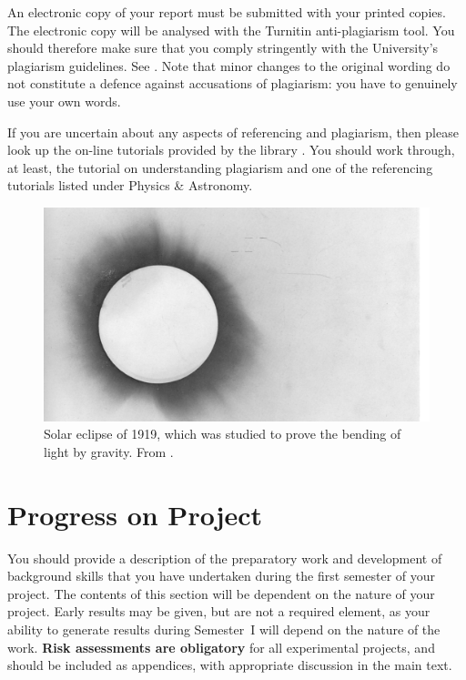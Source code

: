 \documentclass[a4paper,11pt]{article}
\begin{document}
An electronic copy of your report must be submitted with your printed copies. The electronic copy will be analysed with the Turnitin anti-plagiarism tool. You should therefore make sure that you comply stringently with the University's plagiarism guidelines. See \cite{plagiarism}. Note that minor changes to the original wording do not constitute a defence against accusations of plagiarism: you have to genuinely use your own words.

If you are uncertain about any aspects of referencing and plagiarism, then please look up the on-line tutorials provided by the library \cite{Referencing}. You should work through, at least, the tutorial on understanding plagiarism and one of the referencing tutorials listed under Physics \& Astronomy. 



\begin{figure}
\centering
\includegraphics[width=\textwidth]{Dyson.jpeg}
\caption{\label{fig:eclipse}Solar eclipse of 1919, which was studied to prove the bending of light by gravity. From \cite{Dyson}.}
\end{figure}





\section{Progress on Project}
You should provide a description of the preparatory work and development of background skills that you have undertaken during the first semester of your project. The contents of this section will be dependent on the nature of your project. Early results may be given, but are not a required element, as your ability to generate results during Semester~I will depend on the nature of the work. \textbf{Risk assessments are obligatory} for all experimental projects, and should be included as appendices, with appropriate discussion in the main text.
\end{document}
